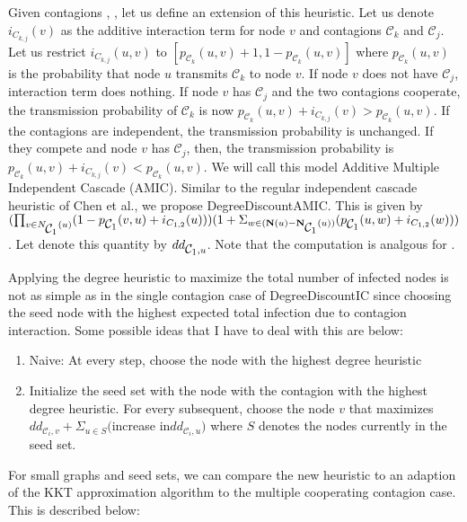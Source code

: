 \documentclass[11pt]{article}
\begin{document}
Given contagions \cone{}, \ctwo{}, let us define an extension of this heuristic. Let us denote $i_{C_{k,j}}(v)$ as the additive interaction term for node $v$ and contagions $\mathcal{C}_{k}$ and $\mathcal{C}_{j}$. Let us restrict $i_{C_{k,j}}(u, v)$ to $[p_{\mathcal{C}_{k}}(u,v)+1, 1-p_{\mathcal{C}_{k}}(u,v)]$ where $p_{\mathcal{C}_{k}}(u,v)$ is the probability that node $u$ transmits $\mathcal{C}_{k}$ to node $v$. If node $v$ does not have $\mathcal{C}_j$, interaction term does nothing. If node $v$ has $\mathcal{C}_j$ and the two contagions cooperate, the transmission probability of $\mathcal{C}_k$ is now $p_{\mathcal{C}_{k}}(u,v) + i_{C_{k,j}}(v) > p_{\mathcal{C}_{k}}(u,v)$. If the contagions are independent, the transmission probability is unchanged. If they compete and node $v$ has $\mathcal{C}_j$, then,  the transmission probability is $p_{\mathcal{C}_{k}}(u,v) + i_{C_{k,j}}(v) < p_{\mathcal{C}_{k}}(u,v)$. We will call this model Additive Multiple Independent Cascade (AMIC). Similar to the regular independent cascade heuristic of Chen et al., we propose DegreeDiscountAMIC.   This is given by $(\prod_{v\in \mathbf{}{N}_{\mbox{$\mathcal{C}_1$}{}}(u)}(1-p_{\mbox{$\mathcal{C}_1$}{}}(v,u) + i_{C_{1,2}}(u)))(1+\Sigma_{w \in  (\mathbf{N}(u)-  \mathbf{N}_{\mbox{$\mathcal{C}_1$}{}}(u))}(p_{\mbox{$\mathcal{C}_1$}{}}(u,w)+ i_{C_{1,2}}(w)))$. Let denote this quantity by $dd_{\mbox{$\mathcal{C}_1$}{}, u}$. Note that the computation is analgous for \ctwo{}.


Applying the degree heuristic to maximize the total number of infected nodes is not as simple as in the single contagion case of DegreeDiscountIC since choosing the seed node with the highest expected total infection due to contagion interaction. Some possible ideas that I have to deal with this are below:


\begin{enumerate}
    \item Naive: At every step, choose the node with the highest degree heuristic
    \item Initialize the seed set with the node with the contagion with the highest degree heuristic. For every subsequent, choose the node $v$ that maximizes $dd_{\mathcal{C}_i,v} + \Sigma_{u\in S}($increase in$ dd_{\mathcal{C}_i,u})$ where $S$ denotes the nodes currently in the seed set.
\end{enumerate}

For small graphs and seed sets, we can compare the new heuristic to an adaption of the KKT approximation algorithm to the multiple cooperating contagion case. This is described below:
\end{document}
